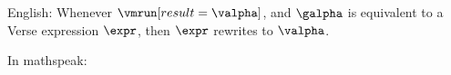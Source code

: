 \documentclass[]{article}
\begin{document}

English: Whenever $\vmrun[result=\valpha]$, and $\galpha$ is equivalent to 
a Verse expression $\expr$, then $\expr$ rewrites to $\valpha$. 

In mathspeak: 


\end{document}
